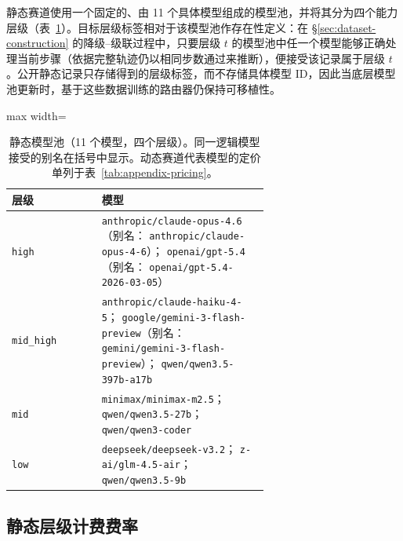 静态赛道使用一个固定的、由 11 个具体模型组成的模型池，并将其分为四个能力层级（表~\ref{tab:appendix-model-pool}）。目标层级标签相对于该模型池作存在性定义：在 \S\ref{sec:dataset-construction} 的降级--级联过程中，只要层级 $t$ 的模型池中任一个模型能够正确处理当前步骤（依据完整轨迹仍以相同步数通过来推断），便接受该记录属于层级 $t$。公开静态记录只存储得到的层级标签，而不存储具体模型 ID，因此当底层模型池更新时，基于这些数据训练的路由器仍保持可移植性。

\begin{table}[ht]
\centering
\small
\caption{静态模型池（11 个模型，四个层级）。同一逻辑模型接受的别名在括号中显示。动态赛道代表模型的定价单列于表~\ref{tab:appendix-pricing}。}
\label{tab:appendix-model-pool}
\begin{adjustbox}{max width=\linewidth}
\begin{tabular}{lp{0.65\linewidth}}
\toprule
层级 & 模型 \\
\midrule
\texttt{high}     & \texttt{anthropic/claude-opus-4.6}（别名：
                     \texttt{anthropic/claude-opus-4-6}）；
                     \texttt{openai/gpt-5.4}（别名：
                     \texttt{openai/gpt-5.4-2026-03-05}） \\
\texttt{mid\_high} & \texttt{anthropic/claude-haiku-4-5}；
                     \texttt{google/gemini-3-flash-preview}（别名：
                     \texttt{gemini/gemini-3-flash-preview}）；
                     \texttt{qwen/qwen3.5-397b-a17b} \\
\texttt{mid}      & \texttt{minimax/minimax-m2.5}；
                     \texttt{qwen/qwen3.5-27b}；
                     \texttt{qwen/qwen3-coder} \\
\texttt{low}      & \texttt{deepseek/deepseek-v3.2}；
                     \texttt{z-ai/glm-4.5-air}；
                     \texttt{qwen/qwen3.5-9b} \\
\bottomrule
\end{tabular}
\end{adjustbox}
\end{table}

\subsection{静态层级计费费率}
\label{app:static-tier-rates}

